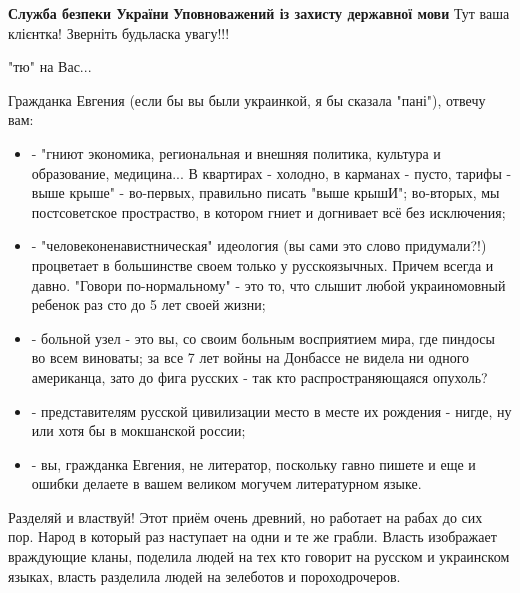 \begin{itemize}
\begin{itemize}

\textbf{Служба безпеки України}
\textbf{Уповноважений із захисту державної мови}
Тут ваша клієнтка!
Зверніть будьласка увагу!!!


"тю" на Вас...



Гражданка Евгения (если бы вы были украинкой, я бы сказала "пані"), отвечу вам:

\begin{itemize}
\item - "гниют экономика, региональная и внешняя политика, культура и образование,
медицина... В квартирах - холодно, в карманах - пусто, тарифы - выше крыше" -
во-первых, правильно писать "выше крышИ"; во-вторых, мы постсоветское
простраство, в котором гниет и догнивает всё без исключения;

\item - "человеконенавистническая" идеология (вы сами это слово придумали?!)
процветает в большинстве своем только у русскоязычных. Причем всегда и давно.
"Говори по-нормальному" - это то, что слышит любой украиномовный ребенок раз
сто до 5 лет своей жизни;

\item - больной узел - это вы, со своим больным восприятием мира, где пиндосы во всем
виноваты; за все 7 лет войны на Донбассе не видела ни одного американца, зато
до фига русских - так кто распространяющаяся опухоль?

\item - представителям русской цивилизации место в месте их рождения - нигде, ну или
хотя бы в мокшанской россии;

\item - вы, гражданка Евгения, не литератор, поскольку гавно пишете и еще и ошибки
делаете в вашем великом могучем литературном языке.
\end{itemize}



Разделяй и властвуй! Этот приём очень древний, но работает на рабах до сих пор.
Народ в который раз наступает на одни и те же грабли. Власть изображает
враждующие кланы, поделила людей на тех кто говорит на русском и украинском
языках, власть разделила людей на зелеботов и пороходрочеров.


\end{itemize}
\end{itemize}
